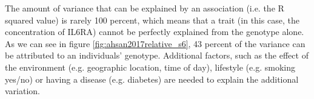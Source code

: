 The amount of variance that can be explained by an association (i.e.
the R squared value) is rarely 100 percent, which means that a trait (in
this case, the concentration of IL6RA) cannot be perfectly explained
from the genotype alone. As we can see in figure \ref{fig:ahsan2017relative_s6}, 
43 percent of the variance can be attributed to an individuals'
genotype. 
Additional factors, 
such as the effect
of the environment (e.g. geographic location, time of day), 
lifestyle (e.g. smoking yes/no) or having a disease (e.g. diabetes) 
are needed to explain the additional variation.

